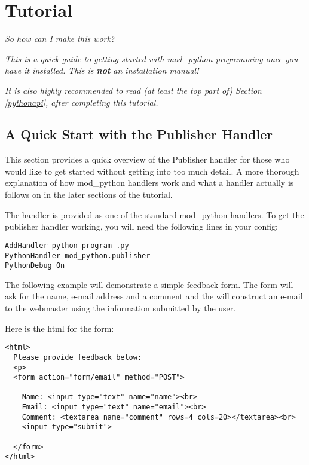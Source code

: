\chapter{Tutorial\label{tutorial}}

\begin{flushright}
\emph{So how can I make this work?}
\end{flushright}

\emph{This is a quick guide to getting started with mod_python 
programming once you have it installed. This is \textbf{not} an
installation manual!}

\emph{It is also highly recommended to read (at least the top part of)
Section \ref{pythonapi},  after
completing this tutorial.}

\section{A Quick Start with the Publisher Handler\label{tut-pub}}

This section provides a quick overview of the Publisher handler for
those who would like to get started without getting into too much
detail. A more thorough explanation of how mod_python handlers work
and what a handler actually is follows on in the later sections of the
tutorial.

The  handler is provided as one of the standard
mod_python handlers. To get the publisher handler working,
you will need the following lines in your config:

\begin{verbatim}
AddHandler python-program .py
PythonHandler mod_python.publisher
PythonDebug On
\end{verbatim}

The following example will demonstrate a simple feedback form. The
form will ask for the name, e-mail address and a comment and the will
construct an e-mail to the webmaster using the information submitted
by the user.

Here is the html for the form:

\begin{verbatim}
<html>
  Please provide feedback below:
  <p>                           
  <form action="form/email" method="POST">

    Name: <input type="text" name="name"><br>
    Email: <input type="text" name="email"><br>
    Comment: <textarea name="comment" rows=4 cols=20></textarea><br>
    <input type="submit">

  </form>
</html>  
\end{verbatim}

